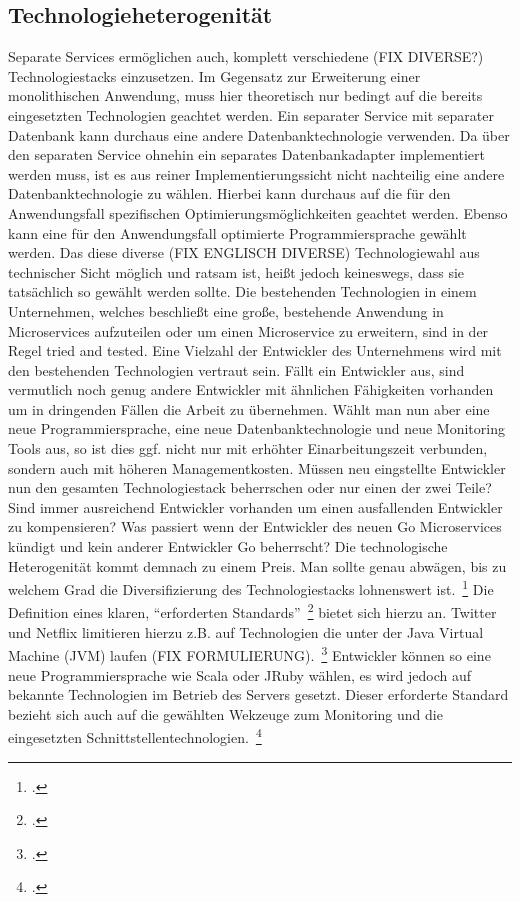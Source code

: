 \subsection{Technologieheterogenität}
Separate Services ermöglichen auch, komplett verschiedene (FIX DIVERSE?) Technologiestacks einzusetzen. Im Gegensatz zur Erweiterung einer monolithischen Anwendung, muss hier theoretisch nur bedingt auf die bereits eingesetzten Technologien geachtet werden. Ein separater Service mit separater Datenbank kann durchaus eine andere Datenbanktechnologie verwenden. Da über den separaten Service ohnehin ein separates Datenbankadapter implementiert werden muss, ist es aus reiner Implementierungssicht nicht nachteilig eine andere Datenbanktechnologie zu wählen. Hierbei kann durchaus auf die für den Anwendungsfall spezifischen Optimierungsmöglichkeiten geachtet werden. Ebenso kann eine für den Anwendungsfall optimierte Programmiersprache gewählt werden.
Das diese diverse (FIX ENGLISCH DIVERSE) Technologiewahl aus technischer Sicht möglich und ratsam ist, heißt jedoch keineswegs, dass sie tatsächlich so gewählt werden sollte. Die bestehenden Technologien in einem Unternehmen, welches beschließt eine große, bestehende Anwendung in Microservices aufzuteilen oder um einen Microservice zu erweitern, sind in der Regel tried and tested. Eine Vielzahl der Entwickler des Unternehmens wird mit den bestehenden Technologien vertraut sein. Fällt ein Entwickler aus, sind vermutlich noch genug andere Entwickler mit ähnlichen Fähigkeiten vorhanden um in dringenden Fällen die Arbeit zu übernehmen. Wählt man nun aber eine neue Programmiersprache, eine neue Datenbanktechnologie und neue Monitoring Tools aus, so ist dies ggf. nicht nur mit erhöhter Einarbeitungszeit verbunden, sondern auch mit höheren Managementkosten. Müssen neu eingstellte Entwickler nun den gesamten Technologiestack beherrschen oder nur einen der zwei Teile? Sind immer ausreichend Entwickler vorhanden um einen ausfallenden Entwickler zu kompensieren? Was passiert wenn der Entwickler des neuen Go Microservices kündigt und kein anderer Entwickler Go beherrscht? Die technologische Heterogenität kommt demnach zu einem Preis. Man sollte genau abwägen, bis zu welchem Grad die Diversifizierung des Technologiestacks lohnenswert ist.~\footcite[vgl.][Seiten 5, 6]{newman2015building}
Die Definition eines klaren, ``erforderten Standards''~\footcite[vgl.][Seiten 20, 21]{newman2015building} bietet sich hierzu an. Twitter und Netflix limitieren hierzu z.B. auf Technologien die unter der Java Virtual Machine (JVM) laufen (FIX FORMULIERUNG).~\footcite[][Seite 6]{newman2015building} Entwickler können so eine neue Programmiersprache wie Scala oder JRuby wählen, es wird jedoch auf bekannte Technologien im Betrieb des Servers gesetzt. Dieser erforderte Standard bezieht sich auch auf die gewählten Wekzeuge zum Monitoring und die eingesetzten Schnittstellentechnologien.~\footcite[vgl.][Seite 21]{newman2015building}

